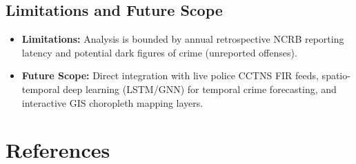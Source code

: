 \documentclass[12pt,a4paper]{report}
\begin{document}
\section{Limitations and Future Scope}
\begin{itemize}[leftmargin=*]
    \item \textbf{Limitations:} Analysis is bounded by annual retrospective NCRB reporting latency and potential dark figures of crime (unreported offenses).
    \item \textbf{Future Scope:} Direct integration with live police CCTNS FIR feeds, spatio-temporal deep learning (LSTM/GNN) for temporal crime forecasting, and interactive GIS choropleth mapping layers.
\end{itemize}

\chapter*{References}
\end{document}
